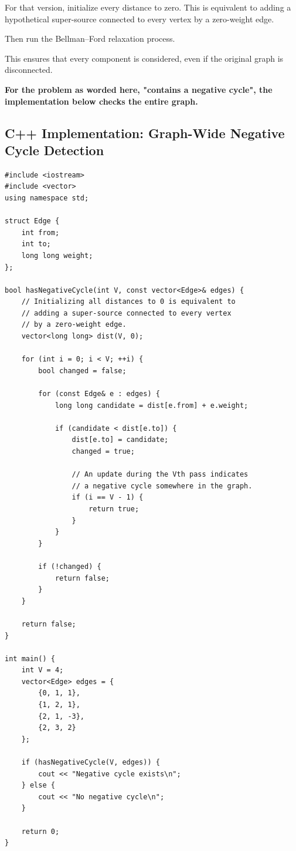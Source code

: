 For that version, initialize every distance to zero. This is equivalent to adding a hypothetical super-source connected to every vertex by a zero-weight edge.

Then run the Bellman--Ford relaxation process.

This ensures that every component is considered, even if the original graph is disconnected.

\textbf{For the problem as worded here, "contains a negative cycle", the implementation below checks the entire graph.}

\subsection{C++ Implementation: Graph-Wide Negative Cycle Detection}

\begin{lstlisting}[style=cppstyle]
#include <iostream>
#include <vector>
using namespace std;

struct Edge {
    int from;
    int to;
    long long weight;
};

bool hasNegativeCycle(int V, const vector<Edge>& edges) {
    // Initializing all distances to 0 is equivalent to
    // adding a super-source connected to every vertex
    // by a zero-weight edge.
    vector<long long> dist(V, 0);

    for (int i = 0; i < V; ++i) {
        bool changed = false;

        for (const Edge& e : edges) {
            long long candidate = dist[e.from] + e.weight;

            if (candidate < dist[e.to]) {
                dist[e.to] = candidate;
                changed = true;

                // An update during the Vth pass indicates
                // a negative cycle somewhere in the graph.
                if (i == V - 1) {
                    return true;
                }
            }
        }

        if (!changed) {
            return false;
        }
    }

    return false;
}

int main() {
    int V = 4;
    vector<Edge> edges = {
        {0, 1, 1},
        {1, 2, 1},
        {2, 1, -3},
        {2, 3, 2}
    };

    if (hasNegativeCycle(V, edges)) {
        cout << "Negative cycle exists\n";
    } else {
        cout << "No negative cycle\n";
    }

    return 0;
}
\end{lstlisting}

